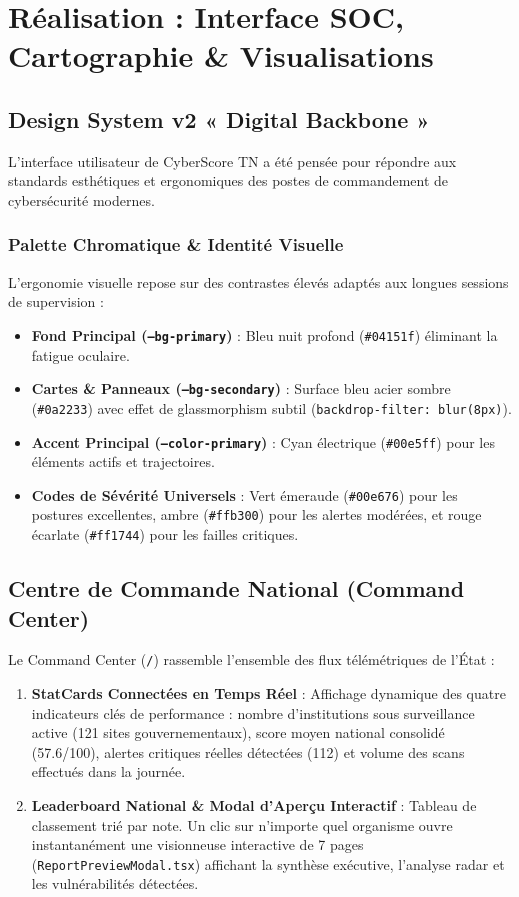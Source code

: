 \chapter[Interface SOC \& Visualisations]{Réalisation : Interface SOC, Cartographie \& Visualisations}
\label{chap:dashboard}

\section{Design System v2 « Digital Backbone »}
L'interface utilisateur de CyberScore TN a été pensée pour répondre aux standards esthétiques et ergonomiques des postes de commandement de cybersécurité modernes.

\subsection{Palette Chromatique \& Identité Visuelle}
L'ergonomie visuelle repose sur des contrastes élevés adaptés aux longues sessions de supervision :
\begin{itemize}
    \item \textbf{Fond Principal (\texttt{--bg-primary})} : Bleu nuit profond (\texttt{\#04151f}) éliminant la fatigue oculaire.
    \item \textbf{Cartes \& Panneaux (\texttt{--bg-secondary})} : Surface bleu acier sombre (\texttt{\#0a2233}) avec effet de glassmorphism subtil (\texttt{backdrop-filter: blur(8px)}).
    \item \textbf{Accent Principal (\texttt{--color-primary})} : Cyan électrique (\texttt{\#00e5ff}) pour les éléments actifs et trajectoires.
    \item \textbf{Codes de Sévérité Universels} : Vert émeraude (\texttt{\#00e676}) pour les postures excellentes, ambre (\texttt{\#ffb300}) pour les alertes modérées, et rouge écarlate (\texttt{\#ff1744}) pour les failles critiques.
\end{itemize}

\section{Centre de Commande National (Command Center)}
Le Command Center (\texttt{/}) rassemble l'ensemble des flux télémétriques de l'État :
\begin{enumerate}
    \item \textbf{StatCards Connectées en Temps Réel} : Affichage dynamique des quatre indicateurs clés de performance : nombre d'institutions sous surveillance active (121 sites gouvernementaux), score moyen national consolidé (57.6/100), alertes critiques réelles détectées (112) et volume des scans effectués dans la journée.
    \item \textbf{Leaderboard National \& Modal d'Aperçu Interactif} : Tableau de classement trié par note. Un clic sur n'importe quel organisme ouvre instantanément une visionneuse interactive de 7 pages (\texttt{ReportPreviewModal.tsx}) affichant la synthèse exécutive, l'analyse radar et les vulnérabilités détectées.
\end{enumerate}

